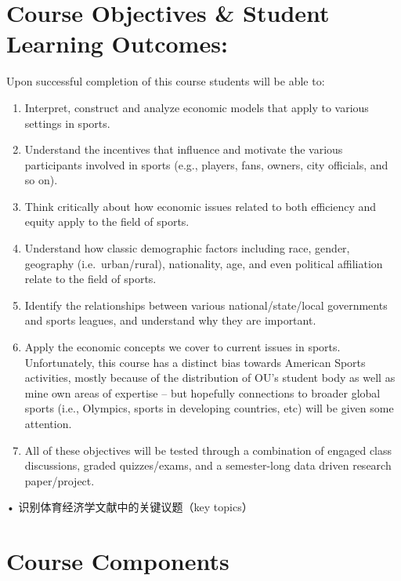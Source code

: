 \documentclass[11pt,]{article}
\begin{document}
\hypertarget{course-objectives-student-learning-outcomes}{%
\section{Course Objectives \& Student Learning
Outcomes:}\label{course-objectives-student-learning-outcomes}}

Upon successful completion of this course students will be able to:

\begin{enumerate}
\def\labelenumi{\arabic{enumi}.}
\item
  Interpret, construct and analyze economic models that apply to various
  settings in sports.
\item
  Understand the incentives that influence and motivate the various
  participants involved in sports (e.g., players, fans, owners, city
  officials, and so on).
\item
  Think critically about how economic issues related to both efficiency
  and equity apply to the field of sports.
\item
  Understand how classic demographic factors including race, gender,
  geography (i.e.~urban/rural), nationality, age, and even political
  affiliation relate to the field of sports.
\item
  Identify the relationships between various national/state/local
  governments and sports leagues, and understand why they are important.
\item
  Apply the economic concepts we cover to current issues in sports.
  Unfortunately, this course has a distinct bias towards American Sports
  activities, mostly because of the distribution of OU's student body as
  well as mine own areas of expertise -- but hopefully connections to
  broader global sports (i.e., Olympics, sports in developing countries,
  etc) will be given some attention.
\item
  All of these objectives will be tested through a combination of
  engaged class discussions, graded quizzes/exams, and a semester-long
  data driven research paper/project.
\end{enumerate}

• 识别体育经济学文献中的关键议题（key topics）

\hypertarget{course-components}{%
\section{Course Components}\label{course-components}}
\end{document}
